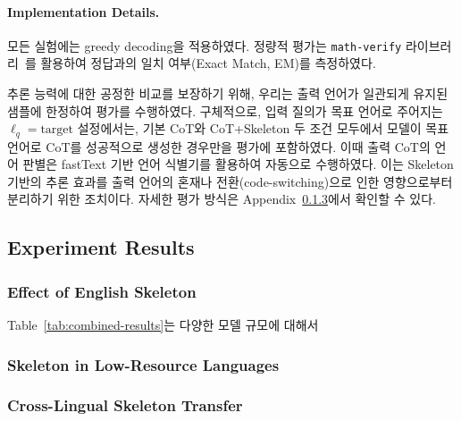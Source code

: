 \paragraph{Implementation Details.}
모든 실험에는 greedy decoding을 적용하였다. 정량적 평가는 \texttt{math-verify} 라이브러리~\citep{mathverify}를 활용하여 정답과의 일치 여부(Exact Match, EM)를 측정하였다.

추론 능력에 대한 공정한 비교를 보장하기 위해, 우리는 출력 언어가 일관되게 유지된 샘플에 한정하여 평가를 수행하였다. 구체적으로, 입력 질의가 목표 언어로 주어지는 $\ell_q=\text{target}$ 설정에서는, 기본 CoT와 CoT+Skeleton 두 조건 모두에서 모델이 목표 언어로 CoT를 성공적으로 생성한 경우만을 평가에 포함하였다. 이때 출력 CoT의 언어 판별은 fastText 기반 언어 식별기를 활용하여 자동으로 수행하였다. 이는 Skeleton 기반의 추론 효과를 출력 언어의 혼재나 전환(code-switching)으로 인한 영향으로부터 분리하기 위한 조치이다. 자세한 평가 방식은 Appendix~\ref{}에서 확인할 수 있다.




\subsection{Experiment Results}
\subsubsection{Effect of English Skeleton}
Table~\ref{tab:combined-results}는 다양한 모델 규모에 대해서 
\subsubsection{Skeleton in Low-Resource Languages}

\subsubsection{Cross-Lingual Skeleton Transfer}


